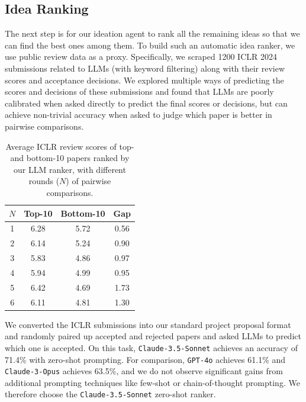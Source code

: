 \subsection{Idea Ranking}
\label{sec:agent_ranking}

The next step is for our ideation agent to rank all the remaining ideas so that we can find the best ones among them.
To build such an automatic idea ranker, we use public review data as a proxy. Specifically,
we scraped 1200 ICLR 2024 submissions related to LLMs (with keyword filtering) along with their review scores and acceptance decisions. We explored multiple ways of predicting the scores and decisions of these submissions and found that LLMs are poorly calibrated when asked directly to predict the final scores or decisions, but can achieve non-trivial accuracy when asked to judge which paper is better in pairwise comparisons. 


\begin{table}
\small
\centering
\begin{tabular}{c|c|c|c}
\hline
$N$ & Top-10 & Bottom-10 & Gap \\
\hline
1   & 6.28   & 5.72  &  0.56 \\
2   & 6.14   & 5.24  &  0.90 \\
3   & 5.83  & 4.86  & 0.97 \\
4   & 5.94  &  4.99 & 0.95 \\
5   & 6.42  &  4.69  &  1.73 \\
6   & 6.11  &  4.81  &  1.30 \\
\hline
\end{tabular}
\caption{Average ICLR review scores of top- and bottom-10 papers ranked by our LLM ranker, with different rounds ($N$) of pairwise comparisons.}
\label{table:ranker}
\end{table}


We converted the ICLR submissions into our standard project proposal format and randomly paired up accepted and rejected papers and asked LLMs to predict which one is accepted. On this task,  \texttt{Claude-3.5-Sonnet} achieves an accuracy of 71.4\% with zero-shot prompting. For comparison, \texttt{GPT-4o} achieves 61.1\% and \texttt{Claude-3-Opus} achieves 63.5\%, and we do not observe significant gains from additional prompting techniques like few-shot or chain-of-thought prompting. 
We therefore choose the \texttt{Claude-3.5-Sonnet} zero-shot ranker. 

